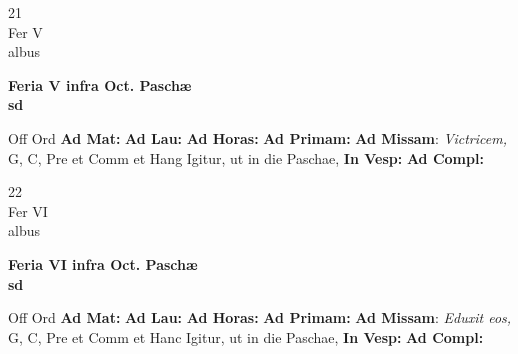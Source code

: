 \documentclass[10pt, openany]{book}
\begin{document}
        \begin{center}
            \begin{minipage}{3.5in}
                \vspace{2em}
                \begin{minipage}{0.5in}
                    {\Huge 21} \\
                    {\normalsize Fer V} \\
                    {\normalsize albus}
                \end{minipage}
                \begin{minipage}{3.0in}
                    \textbf{ \large Feria V infra Oct. Paschæ \\
                    \textnormal{\normalsize sd}} \\ 
                \end{minipage}
                \begin{justify}Off Ord
                    \textbf{Ad Mat: }
                    \textbf{Ad Lau: }
                    \textbf{Ad Horas: }
                    \textbf{Ad Primam: }\textbf{Ad Missam}: \textit{Victricem,} G, C, Pre et Comm et Hang Igitur, ut in die Paschae,  
                    \textbf{In Vesp: }
                    \textbf{Ad Compl: }
                \end{justify}
            \end{minipage}
        \end{center}
    
        \begin{center}
            \begin{minipage}{3.5in}
                \vspace{2em}
                \begin{minipage}{0.5in}
                    {\Huge 22} \\
                    {\normalsize Fer VI} \\
                    {\normalsize albus}
                \end{minipage}
                \begin{minipage}{3.0in}
                    \textbf{ \large Feria VI infra Oct. Paschæ \\
                    \textnormal{\normalsize sd}} \\ 
                \end{minipage}
                \begin{justify}Off Ord
                    \textbf{Ad Mat: }
                    \textbf{Ad Lau: }
                    \textbf{Ad Horas: }
                    \textbf{Ad Primam: }\textbf{Ad Missam}: \textit{Eduxit eos,} G, C, Pre et Comm et Hanc Igitur, ut in die Paschae,  
                    \textbf{In Vesp: }
                    \textbf{Ad Compl: }
                \end{justify}
            \end{minipage}
        \end{center}
    
\end{document}
